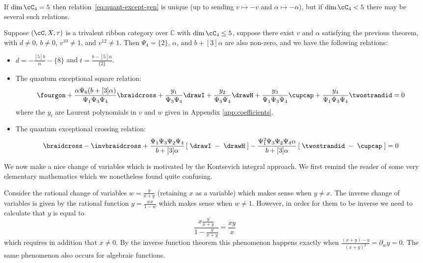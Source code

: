 \documentclass[12pt]{amsart}
\begin{document}
If $\dim{\cC_4} = 5$ then relation~\eqref{eq:quant-except-gen} is
unique (up to sending $v \mapsto -v$ and $\alpha \mapsto -\alpha$),
but if $\dim{\cC_4} < 5$ there may be several such relations.

\begin{theorem}\label{thm:square-crossing}
Suppose $(\cC, X, \tau)$ is a trivalent ribbon category over $\mathbb{C}$ with
$\dim{\cC_4} \leq 5$, suppose there exist $v$ and $\alpha$ satisfying the
previous theorem, with $d \neq 0 $, $b \neq 0$, $v^{10} \neq 1$, and $v^{12}
\neq 1$.  Then $\Psi_4 = \{2\}$, $\alpha$, and $b+[3]\alpha$ are
also non-zero, and we have the following relations:
\begin{itemize}
\item
$
  d = -\frac{[5] b}{\alpha} - \{8\} 
$
and
$
  t = \frac{b-[5] \alpha}{\{2\}}.
$
\item

The quantum exceptional square relation:
\begin{equation*} \fourgon + \frac{\alpha \Psi_6 (b+[3]\alpha)}{\Psi_1 \Psi_3 \Psi_4}  \braidcross + \frac{y_1}{\Psi_3 \Psi_4}  \drawI + \frac{y_2}{\Psi_3 \Psi_4}  \drawH + \frac{y_3}{\Psi_1 \Psi_3 \Psi_4} \cupcap + \frac{y_4}{\Psi_1 \Psi_3 \Psi_4} \twostrandid =0
\end{equation*}
where the $y_i$ are Laurent polynomials in $v$ and $w$ given in Appendix \ref{app:coefficients}.
\item
The quantum exceptional crossing relation:
\begin{equation*}
\braidcross - \invbraidcross + \frac{\Psi_1 \Psi_3 \Psi_2 \Psi_4}{b+[3]\alpha} \left[\; \drawI \; - \; \drawH \; \right] - \frac{\Psi_1^2 \Psi_3 \Psi_2 \Psi_4 \alpha}{b+[3]\alpha} \left[\; \twostrandid \; - \; \cupcap \; \right] = 0
\end{equation*}
\end{itemize}

\end{theorem}

We now make a nice change of variables which is motivated by the Kontsevich integral approach.  We first remind the reader of some very elementary mathematics which we nonetheless found quite confusing.

\begin{remark}
Consider the rational change of variables $w= \frac{y}{x+y}$ (retaining $x$ as a variable) which makes sense when $y \neq x$.  The inverse change of variables is given by the rational function $y = \frac{wx}{1-w}$ which makes sense when $w \neq 1$.  However, in order for them to be inverse we need to calculate that $y$ is equal to
$$\frac{x\frac{y}{x+y}}{1-\frac{y}{x+y}} = \frac{xy}{x}$$ which requires in addition that $x \neq 0$.  By the inverse function theorem this phenomenon happens exactly when $\frac{(x+y)-y}{(x+y)^2} = \partial_w y = 0$.  The same phenomenon also occurs for algebraic functions.
\end{remark}
\end{document}

